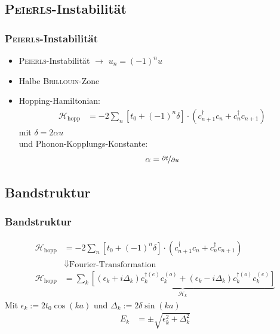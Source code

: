 \subsection{\textsc{Peierls}-Instabilität}
\begin{frame}
\frametitle{\textsc{Peierls}-Instabilität}
\centering
{}
\begin{itemize}
	\item \textsc{Peierls}-Instabilität $\to$ $u_n = (-1)^nu$
	\item Halbe \textsc{Brillouin}-Zone
	\item Hopping-Hamiltonian:
	\begin{align*}
		\mathcal{H}_\text{hopp} &= -2\sum_n \left[t_0 + (-1)^n\delta\right]\cdot\left(c_{n+1}^\dagger c_n + c_n^\dagger c_{n+1}\right)
	\end{align*}
	mit $\delta = 2\alpha u$\\
	und Phonon-Kopplungs-Konstante:
	\begin{align*}
		\alpha = \nicefrac{\partial t}{\partial u}
	\end{align*}
\end{itemize}
\end{frame}

\subsection{Bandstruktur}
\begin{frame}
\frametitle{Bandstruktur}
\begin{align*}
\mathcal{H}_\text{hopp} &= -2\sum_n \left[t_0 + (-1)^n\delta\right]\cdot\left(c_{n+1}^\dagger c_n + c_n^\dagger c_{n+1}\right)\\
&\Downarrow\text{Fourier-Transformation}\\
\mathcal{H}_\text{hopp} &= \sum_k \underbrace{\left[
\left(\epsilon_k + i\Delta_k\right)c_{k}^{\dagger(e)}c_{k}^{(o)} + \left(\epsilon_k-i\Delta_k \right)	c_{k}^{\dagger(o)}c_{k}^{(e)}\right]}_{\mathcal{H}_k}
\end{align*}
Mit $\epsilon_k := 2t_0\cos(ka)$ und $\Delta_k := 2\delta\sin(ka)$\\
\begin{align*}
E_k &= \pm \sqrt{\epsilon_k^2+\Delta_k^2}
\label{equation_energy_band}
\end{align*}
\end{frame}

